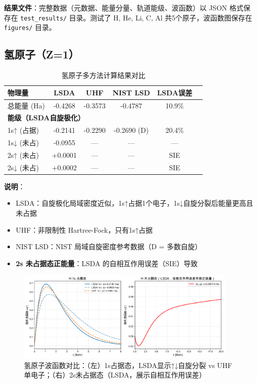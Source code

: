 \documentclass[12pt,a4paper]{article}
\begin{document}
\textbf{结果文件}：完整数据（元数据、能量分量、轨道能级、波函数）以 JSON 格式保存在 \texttt{test\_results/} 目录。测试了 H, He, Li, C, Al 共5个原子，波函数图保存在 \texttt{figures/} 目录。

\subsection{氢原子（Z=1）}

\begin{table}[H]
    \centering
    \caption{氢原子多方法计算结果对比}
    \begin{tabular}{lccccc}
        \toprule
        \textbf{物理量}                & \textbf{LSDA} & \textbf{UHF} & \textbf{NIST LSD} & \textbf{LSDA误差} \\
        \midrule
        总能量 (Ha)                    & -0.4268       & -0.3573      & -0.4787           & 10.9\%          \\
        \midrule
        \multicolumn{5}{l}{\textbf{能级（LSDA自旋极化）}}                                                        \\
        1s↑ (占据)                    & -0.2141       & -0.2290      & -0.2690 (D)       & 20.4\%          \\
        1s↓ (未占)                    & -0.0955       & ---          & ---               & ---             \\
        \rowcolor{gray!20} 2s↑ (未占) & +0.0001       & ---          & ---               & SIE             \\
        \rowcolor{gray!20} 2s↓ (未占) & +0.0002       & ---          & ---               & SIE             \\
        \bottomrule
    \end{tabular}
\end{table}

\textbf{说明}：
\begin{itemize}
    \item LSDA：自旋极化局域密度近似，1s↑占据1个电子，1s↓自旋分裂后能量更高且未占据
    \item UHF：非限制性 Hartree-Fock，只有1s↑占据
    \item NIST LSD：NIST 局域自旋密度参考数据（D = 多数自旋）
    \item \textbf{2s 未占据态正能量}：LSDA 的自相互作用误差（SIE）导致
\end{itemize}

\begin{figure}[H]
    \centering
    \includegraphics[width=0.95\textwidth]{figures/H_comparison.png}
    \caption{氢原子波函数对比：（左）1s占据态，LSDA显示↑↓自旋分裂 vs UHF单电子；（右）2s未占据态（LSDA，展示自相互作用误差）}
\end{figure}
\end{document}
